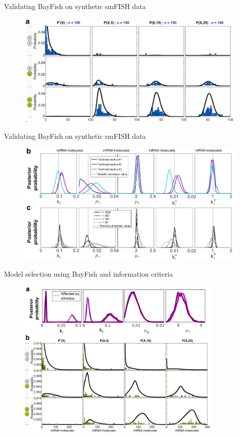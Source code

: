 \documentclass[aspectratio=1610]{beamer}					%
\begin{document}
\begin{frame}{Validating BayFish on synthetic smFISH data}

\begin{figure}
\includegraphics[width=14cm]{figure-3a.png}
\end{figure}

\end{frame}

\begin{frame}{Validating BayFish on synthetic smFISH data}

\begin{figure}
\includegraphics[width=14cm]{figure-3b.png}
\end{figure}

\end{frame}

\begin{frame}{Model selection using BayFish and information criteria}

\begin{figure}
\includegraphics[width=10cm]{figure-4.png}
\end{figure}

\end{frame}
\end{document}
